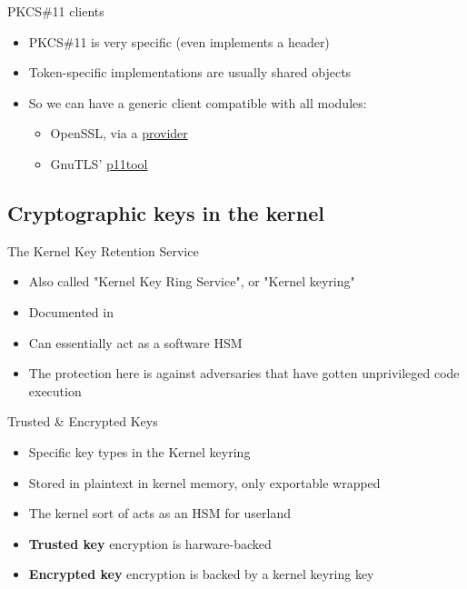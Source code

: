 \begin{frame}{PKCS\#11 clients}
  \begin{itemize}
    \item PKCS\#11 is very specific (even implements a header)
    \item Token-specific implementations are usually shared objects
    \item So we can have a generic client compatible with all modules:
    \begin{itemize}
      \item OpenSSL, via a \href{https://github.com/openssl-projects/pkcs11-provider}{provider}
      \item GnuTLS' \href{https://www.gnutls.org/manual/html_node/p11tool-Invocation.html}{p11tool}
    \end{itemize}
  \end{itemize}
\end{frame}

\subsection{Cryptographic keys in the kernel}

\begin{frame}{The Kernel Key Retention Service}
  \begin{itemize}
    \item Also called "Kernel Key Ring Service", or "Kernel keyring"
    \item Documented in 
    \item Can essentially act as a software HSM
    \item The protection here is against adversaries that have gotten
          unprivileged code execution
  \end{itemize}
\end{frame}

\begin{frame}{Trusted \& Encrypted Keys}
  \begin{itemize}
    \item Specific key types in the Kernel keyring
    \item Stored in plaintext in kernel memory, only exportable wrapped
    \item The kernel sort of acts as an HSM for userland
    \item \textbf{Trusted key} encryption is harware-backed
    \item \textbf{Encrypted key} encryption is backed by a kernel keyring key
  \end{itemize}
\end{frame}
